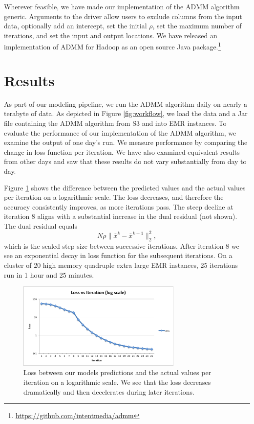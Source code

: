 \documentclass[10pt, conference, compsocconf]{IEEEtran}
\begin{document}
Wherever feasible, we have made our implementation of the ADMM algorithm generic.  Arguments to the driver allow users to exclude columns from the input data, optionally add an intercept, set the initial $\rho$, set the maximum number of iterations, and set the input and output locations. We have released an implementation of ADMM for Hadoop as an open source Java package.\footnote{\url{https://github.com/intentmedia/admm}}

\section{Results}\label{sec:results}
As part of our modeling pipeline, we run the ADMM algorithm daily on nearly a terabyte of data.  As depicted in Figure \ref{fig:workflow}, we load the data and a Jar file containing the ADMM algorithm from S3 and into EMR instances.  To evaluate the performance of our implementation of the ADMM algorithm, we examine the output of one day's run.  We measure performance by comparing the change in loss function per iteration.  We have also examined equivalent results from other days and saw that these results do not vary substantially from day to day.

Figure \ref{fig:iter} shows the difference between the predicted values and the actual values per iteration on a logarithmic scale.  The loss decreases, and therefore the accuracy consistently improves, as more iterations pass.  The steep decline at iteration 8 aligns with a substantial increase in the dual residual (not shown).  The dual residual equals
$$N\rho\|\bar{x}^k-\bar{x}^{k-1}\|^2_2,$$
which is the scaled step size between successive iterations. After iteration 8 we see an exponential decay in loss function for the subsequent iterations.  On a cluster of 20 high memory quadruple extra large EMR instances, 25 iterations run in 1 hour and 25 minutes.

\begin{figure}[!t]
\centering
\includegraphics[width=3.2in]{iter_rnorm_plot}
\caption{Loss between our models predictions and the actual values per iteration on a logarithmic scale.  We see that the loss decreases dramatically and then decelerates during later iterations.}
\label{fig:iter}
\end{figure}
\end{document}
